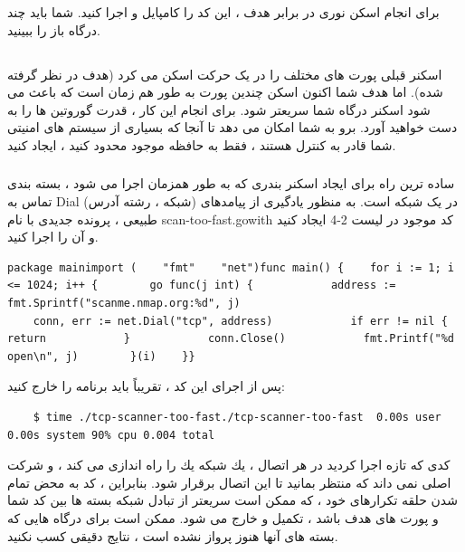 \documentclass[12pt]{book}
\begin{document}
برای انجام اسکن نوری در برابر هدف ، این کد را کامپایل و اجرا کنید. شما باید چند درگاه باز را ببینید.
\subsection{}
اسکنر قبلی پورت های مختلف را در یک حرکت اسکن می کرد (هدف در نظر گرفته شده). اما هدف شما اکنون اسکن چندین پورت به طور هم زمان است که باعث می شود اسکنر درگاه شما سریعتر شود. برای انجام این کار ، قدرت گوروتین ها را به دست خواهید آورد. برو به شما امکان می دهد تا آنجا که بسیاری از سیستم های امنیتی شما قادر به کنترل هستند ، فقط به حافظه موجود محدود کنید ، ایجاد کنید.
\subsubsection{}
ساده ترین راه برای ایجاد اسکنر بندری که به طور همزمان اجرا می شود ، بسته بندی تماس به Dial (شبکه ، رشته آدرس) در یک شبکه است. به منظور یادگیری از پیامدهای طبیعی ، پرونده جدیدی با نام scan-too-fast.gowith کد موجود در لیست 2-4 ایجاد کنید و آن را اجرا کنید.
\begin{latin}
	\begin{lstlisting}[caption={ A scanner that works too fast (https://github.com/blackhat-go/bhg/ch-2/tcp-scanner-too-fast/main.go/)},captionpos=b]
	package mainimport (    "fmt"    "net")func main() {    for i := 1; i <= 1024; i++ {        go func(j int) {            address := fmt.Sprintf("scanme.nmap.org:%d", j)
	conn, err := net.Dial("tcp", address)            if err != nil {                return            }            conn.Close()            fmt.Printf("%d open\n", j)        }(i)    }}
	\end{lstlisting}
\end{latin}

پس از اجرای این کد ، تقریباً باید برنامه را خارج کنید:
\begin{latin}
	\begin{lstlisting}
	$ time ./tcp-scanner-too-fast./tcp-scanner-too-fast  0.00s user 0.00s system 90% cpu 0.004 total
	\end{lstlisting}
\end{latin}
كدی كه تازه اجرا كردید در هر اتصال ، یك شبكه یك را راه اندازی می كند ، و شركت اصلی نمی داند كه منتظر بمانید تا این اتصال برقرار شود. بنابراین ، کد به محض تمام شدن حلقه تکرارهای خود ، که ممکن است سریعتر از تبادل شبکه بسته ها بین کد شما و پورت های هدف باشد ، تکمیل و خارج می شود. ممکن است برای درگاه هایی که بسته های آنها هنوز پرواز نشده است ، نتایج دقیقی کسب نکنید.
\end{document}
